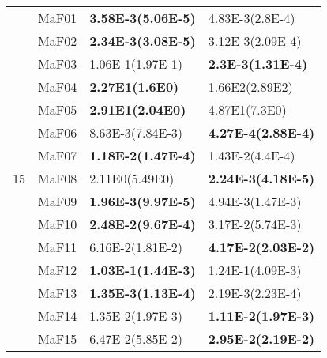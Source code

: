 \documentclass[]{article}
\begin{document}
\begin{table}
\begin{footnotesize}
\begin{tabular}{|l|l|l|l|}
\multirow{15}{*}{15} & MaF01 & \cellcolor{gray95} {\bf 3.58E-3(5.06E-5)} & 4.83E-3(2.8E-4)\\
 & MaF02 & \cellcolor{gray95} {\bf 2.34E-3(3.08E-5)} & 3.12E-3(2.09E-4)\\
 & MaF03 & 1.06E-1(1.97E-1) & \cellcolor{gray95} {\bf 2.3E-3(1.31E-4)}\\
 & MaF04 & \cellcolor{gray95} {\bf 2.27E1(1.6E0)} & 1.66E2(2.89E2)\\
 & MaF05 & \cellcolor{gray95} {\bf 2.91E1(2.04E0)} & 4.87E1(7.3E0)\\
 & MaF06 & 8.63E-3(7.84E-3) & \cellcolor{gray95} {\bf 4.27E-4(2.88E-4)}\\
 & MaF07 & \cellcolor{gray95} {\bf 1.18E-2(1.47E-4)} & 1.43E-2(4.4E-4)\\
 & MaF08 & 2.11E0(5.49E0) & \cellcolor{gray95} {\bf 2.24E-3(4.18E-5)}\\
 & MaF09 & \cellcolor{gray95} {\bf 1.96E-3(9.97E-5)} & 4.94E-3(1.47E-3)\\
 & MaF10 & \cellcolor{gray95} {\bf 2.48E-2(9.67E-4)} & 3.17E-2(5.74E-3)\\
 & MaF11 & 6.16E-2(1.81E-2) & \cellcolor{gray95} {\bf 4.17E-2(2.03E-2)}\\
 & MaF12 & \cellcolor{gray95} {\bf 1.03E-1(1.44E-3)} & 1.24E-1(4.09E-3)\\
 & MaF13 & \cellcolor{gray95} {\bf 1.35E-3(1.13E-4)} & 2.19E-3(2.23E-4)\\
 & MaF14 & 1.35E-2(1.97E-3) & \cellcolor{gray95} {\bf 1.11E-2(1.97E-3)}\\
 & MaF15 & 6.47E-2(5.85E-2) & \cellcolor{gray95} {\bf 2.95E-2(2.19E-2)}\\
\hline
\end{tabular}
\end{footnotesize}
\end{table}
\end{document}
